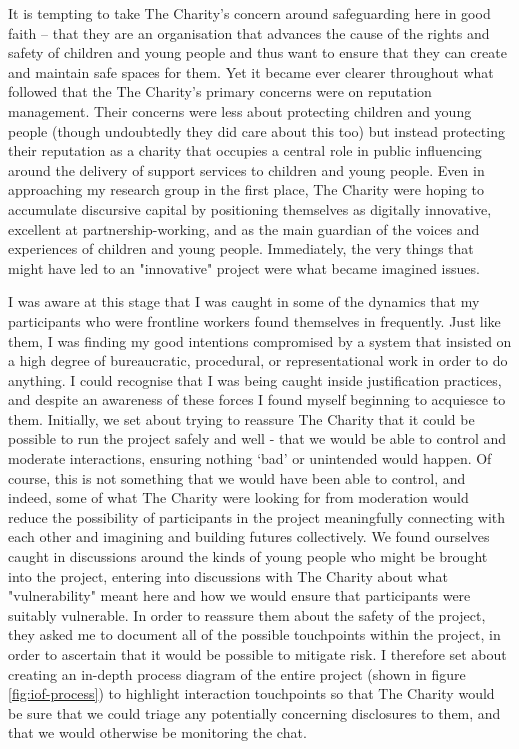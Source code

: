 It is tempting to take The Charity’s concern around safeguarding here in good faith – that they are an organisation that advances the cause of the rights and safety of children and young people and thus want to ensure that they can create and maintain safe spaces for them. Yet it became ever clearer throughout what followed that the The Charity's primary concerns were on reputation management. Their concerns were less about protecting children and young people (though undoubtedly they did care about this too) but instead protecting their reputation as a charity that occupies a central role in public influencing around the delivery of support services to children and young people. Even in approaching my research group in the first place, The Charity were hoping to accumulate discursive capital by positioning themselves as digitally innovative, excellent at partnership-working, and as the main guardian of the voices and experiences of children and young people. Immediately, the very things that might have led to an "innovative" project were what became imagined issues.

I was aware at this stage that I was caught in some of the dynamics that my participants who were frontline workers found themselves in frequently. Just like them, I was finding my good intentions compromised by a system that insisted on a high degree of bureaucratic, procedural, or representational work in order to do anything. I could recognise that I was being caught inside justification practices, and despite an awareness of these forces I found myself beginning to acquiesce to them. Initially, we set about trying to reassure The Charity that it could be possible to run the project safely and well - that we would be able to control and moderate interactions, ensuring nothing ‘bad’ or unintended would happen. Of course, this is not something that we would have been able to control, and indeed, some of what The Charity were looking for from moderation would reduce the possibility of participants in the project meaningfully connecting with each other and imagining and building futures collectively. We found ourselves caught in discussions around the kinds of young people who might be brought into the project, entering into discussions with The Charity about what "vulnerability" meant here and how we would ensure that participants were suitably vulnerable. In order to reassure them about the safety of the project, they asked me to document all of the possible touchpoints within the project, in order to ascertain that it would be possible to mitigate risk. I therefore set about creating an in-depth process diagram of the entire project (shown in figure \ref{fig:iof-process}) to highlight interaction touchpoints so that The Charity would be sure that we could triage any potentially concerning disclosures to them, and that we would otherwise be monitoring the chat. 

